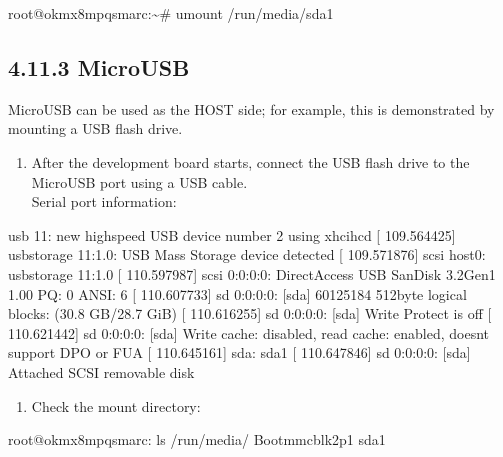 \documentclass[letterpaper,10pt,openany,english]{sphinxmanual}
\begin{document}
\sphinxAtStartPar
root@ok\sphinxhyphen{}mx8mpq\sphinxhyphen{}smarc:\textasciitilde{}\# umount /run/media/sda1\\


\subsection{4.11.3 Micro\sphinxhyphen{}USB}
\label{\detokenize{linux-manual:micro-usb}}
\sphinxAtStartPar
Micro\sphinxhyphen{}USB can be used as the HOST side; for example, this is demonstrated by mounting a USB flash drive.
\begin{enumerate}
%
\item {} 
\sphinxAtStartPar
After the development board starts, connect the USB flash drive to the Micro\sphinxhyphen{}USB port using a USB cable.\\
Serial port information:

\end{enumerate}

\begin{sphinxVerbatim}[commandchars=\\\{\}]
[  109.407327] usb 1\PYGZhy{}1: new high\PYGZhy{}speed USB device number 2 using xhci\PYGZhy{}hcd
[  109.564425] usb\PYGZhy{}storage 1\PYGZhy{}1:1.0: USB Mass Storage device detected
[  109.571876] scsi host0: usb\PYGZhy{}storage 1\PYGZhy{}1:1.0
[  110.597987] scsi 0:0:0:0: Direct\PYGZhy{}Access      USB      SanDisk 3.2Gen1 1.00 PQ: 0 ANSI: 6
[  110.607733] sd 0:0:0:0: [sda] 60125184 512\PYGZhy{}byte logical blocks: (30.8 GB/28.7 GiB)
[  110.616255] sd 0:0:0:0: [sda] Write Protect is off
[  110.621442] sd 0:0:0:0: [sda] Write cache: disabled, read cache: enabled, doesn\PYGZsq{}t support DPO or FUA
[  110.645161]  sda: sda1
[  110.647846] sd 0:0:0:0: [sda] Attached SCSI removable disk
\end{sphinxVerbatim}
\begin{enumerate}
%
\setcounter{enumi}{1}
\item {} 
\sphinxAtStartPar
Check the mount directory:

\end{enumerate}

\begin{sphinxVerbatim}[commandchars=\\\{\}]
root@ok\PYGZhy{}mx8mpq\PYGZhy{}smarc:\PYGZti{}\PYGZsh{} ls /run/media/
Boot\PYGZhy{}mmcblk2p1  sda1
\end{sphinxVerbatim}
\end{document}

